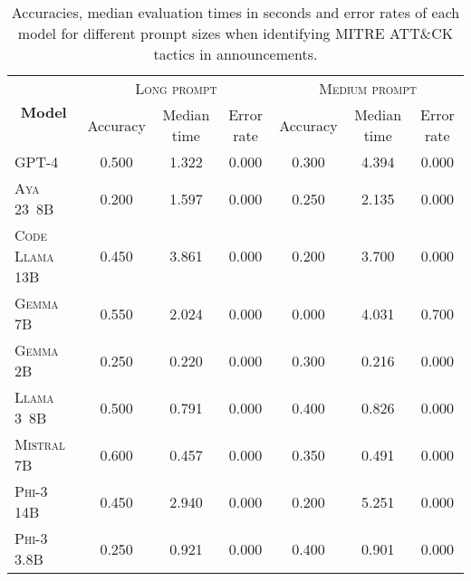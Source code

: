 \begin{table*}
    \caption{Accuracies, median evaluation times in seconds and error rates of each model for different prompt sizes
    when identifying MITRE ATT\&CK tactics in announcements.}
    \label{tab:tactic-detection}
    \begin{tabular}{lcccccc}
        \toprule
        \multicolumn{1}{c}{\multirow{2}{*}{\textbf{Model}}} & \multicolumn{3}{c}{\textsc{Long prompt}} & \multicolumn{3}{c}{\textsc{Medium prompt}} \\
        \cmidrule(lr){2-4} \cmidrule(lr){5-7}
        & Accuracy & Median time  & Error rate & Accuracy & Median time  & Error rate \\
        \midrule
        \textsc{GPT-4}          & 0.500    & 1.322 & 0.000      & 0.300    & 4.394 & 0.000      \\
        \textsc{Aya 23\ 8B}     & 0.200    & 1.597 & 0.000      & 0.250    & 2.135 & 0.000      \\
        \textsc{Code Llama 13B} & 0.450    & 3.861 & 0.000      & 0.200    & 3.700 & 0.000      \\
        \textsc{Gemma 7B}       & 0.550    & 2.024 & 0.000      & 0.000    & 4.031 & 0.700      \\
        \textsc{Gemma 2B}       & 0.250    & 0.220 & 0.000      & 0.300    & 0.216 & 0.000      \\
        \textsc{Llama 3\ 8B}    & 0.500    & 0.791 & 0.000      & 0.400    & 0.826 & 0.000      \\
        \textsc{Mistral 7B}     & 0.600    & 0.457 & 0.000      & 0.350    & 0.491 & 0.000      \\
        \textsc{Phi-3 14B}      & 0.450    & 2.940 & 0.000      & 0.200    & 5.251 & 0.000      \\
        \textsc{Phi-3 3.8B}     & 0.250    & 0.921 & 0.000      & 0.400    & 0.901 & 0.000      \\
        \bottomrule
    \end{tabular}
\end{table*}